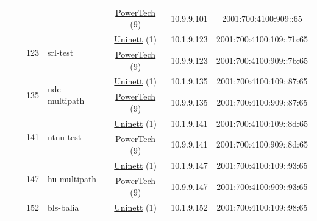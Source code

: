 \begin{small}
\begin{center}
\begin{longtable}{|c|c|c|c|c|c|c|c|}
  &  & \multicolumn{2}{|c|}{} & \multicolumn{2}{|c|}{\tiny{\href{http://www.powertech.no}{PowerTech} (9)}} & \tiny{10.9.9.101} & \tiny{2001:700:4100:909::65} \\* \cline{3-3}\cline{4-4}\cline{5-5}\cline{6-6}\cline{7-7}\cline{8-8}
  &  & \multirow{2}{*}{\tiny{123}} & \multicolumn{1}{|l|}{\multirow{2}{*}{\tiny{srl-test}}} & \multicolumn{2}{|c|}{\tiny{\href{https://www.uninett.no}{Uninett} (1)}} & \tiny{10.1.9.123} & \tiny{2001:700:4100:109::7b:65} \\* \cline{5-5}\cline{6-6}\cline{7-7}\cline{8-8}
  &  &  &  & \multicolumn{2}{|c|}{\tiny{\href{http://www.powertech.no}{PowerTech} (9)}} & \tiny{10.9.9.123} & \tiny{2001:700:4100:909::7b:65} \\* \cline{3-3}\cline{4-4}\cline{5-5}\cline{6-6}\cline{7-7}\cline{8-8}
  &  & \multirow{2}{*}{\tiny{135}} & \multicolumn{1}{|l|}{\multirow{2}{*}{\tiny{ude-multipath}}} & \multicolumn{2}{|c|}{\tiny{\href{https://www.uninett.no}{Uninett} (1)}} & \tiny{10.1.9.135} & \tiny{2001:700:4100:109::87:65} \\* \cline{5-5}\cline{6-6}\cline{7-7}\cline{8-8}
  &  &  &  & \multicolumn{2}{|c|}{\tiny{\href{http://www.powertech.no}{PowerTech} (9)}} & \tiny{10.9.9.135} & \tiny{2001:700:4100:909::87:65} \\* \cline{3-3}\cline{4-4}\cline{5-5}\cline{6-6}\cline{7-7}\cline{8-8}
  &  & \multirow{2}{*}{\tiny{141}} & \multicolumn{1}{|l|}{\multirow{2}{*}{\tiny{ntnu-test}}} & \multicolumn{2}{|c|}{\tiny{\href{https://www.uninett.no}{Uninett} (1)}} & \tiny{10.1.9.141} & \tiny{2001:700:4100:109::8d:65} \\* \cline{5-5}\cline{6-6}\cline{7-7}\cline{8-8}
  &  &  &  & \multicolumn{2}{|c|}{\tiny{\href{http://www.powertech.no}{PowerTech} (9)}} & \tiny{10.9.9.141} & \tiny{2001:700:4100:909::8d:65} \\* \cline{3-3}\cline{4-4}\cline{5-5}\cline{6-6}\cline{7-7}\cline{8-8}
  &  & \multirow{2}{*}{\tiny{147}} & \multicolumn{1}{|l|}{\multirow{2}{*}{\tiny{hu-multipath}}} & \multicolumn{2}{|c|}{\tiny{\href{https://www.uninett.no}{Uninett} (1)}} & \tiny{10.1.9.147} & \tiny{2001:700:4100:109::93:65} \\* \cline{5-5}\cline{6-6}\cline{7-7}\cline{8-8}
  &  &  &  & \multicolumn{2}{|c|}{\tiny{\href{http://www.powertech.no}{PowerTech} (9)}} & \tiny{10.9.9.147} & \tiny{2001:700:4100:909::93:65} \\* \cline{3-3}\cline{4-4}\cline{5-5}\cline{6-6}\cline{7-7}\cline{8-8}
  &  & \multirow{2}{*}{\tiny{152}} & \multicolumn{1}{|l|}{\multirow{2}{*}{\tiny{bls-balia}}} & \multicolumn{2}{|c|}{\tiny{\href{https://www.uninett.no}{Uninett} (1)}} & \tiny{10.1.9.152} & \tiny{2001:700:4100:109::98:65} \\* \cline{5-5}\cline{6-6}\cline{7-7}\cline{8-8}

\end{longtable}
\end{center}
\end{small}
